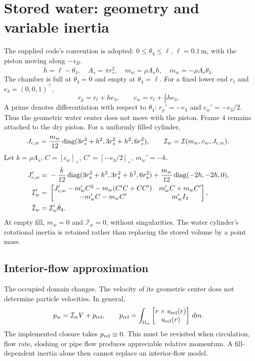 \documentclass[11pt,a4paper]{article}
\newcommand{\sk}[1]{[#1]_\times}\newcommand{\E}{\mathsf E}\newcommand{\B}{\mathsf B}
\begin{document}
\section{Stored water: geometry and variable inertia}
The supplied code's convention is adopted: \(0\leq\theta_4\leq\ell\),
\(\ell=0.1\,\mathrm m\), with the piston moving along \(-z_B\).
\begin{equation}
h=\ell-\theta_4,\quad A_s=\pi r_s^2,\quad m_w=\rho A_sh,\quad
\dot m_w=-\rho A_s\dot\theta_4.\label{eq:mass}
\end{equation}
The chamber is full at \(\theta_4=0\) and empty at \(\theta_4=\ell\).
For a fixed lower end \(r_t\) and \(e_3=(0,0,1)^\top\),
\begin{equation}
r_p=r_t+he_3,\qquad c_w=r_t+\tfrac12he_3.
\end{equation}
A prime denotes differentiation with respect to \(\theta_4\):
\(r_p'=-e_3\) and \(c_w'=-e_3/2\). Thus the geometric water center
does not move with the piston. Frame 4 remains attached to the dry piston.
For a uniformly filled cylinder,
\begin{equation}
J_{c,w}=\frac{m_w}{12}\operatorname{diag}(3r_s^2+h^2,3r_s^2+h^2,6r_s^2),\qquad
\mathcal I_w=\mathcal I(m_w,c_w,J_{c,w}).
\end{equation}
Let \(k=\rho A_s\), \(C=\sk{c_w}\), \(C'=\sk{-e_3/2}\), \(m_w'=-k\).
\begin{align}
J_{c,w}'={}&-\frac{k}{12}\operatorname{diag}(3r_s^2+h^2,3r_s^2+h^2,6r_s^2)
+\frac{m_w}{12}\operatorname{diag}(-2h,-2h,0),\\
\mathcal I_w'={}&\begin{bmatrix}
J_{c,w}'-m_w'C^2-m_w(C'C+CC')&m_w'C+m_wC'\\
-m_w'C-m_wC'&m_w'I_3\end{bmatrix},\\
\dot{\mathcal I}_w={}&\mathcal I_w'\dot\theta_4.\label{eq:Idot}
\end{align}
At empty fill, \(m_w=0\) and \(\mathcal I_w=0\), without singularities.
The water cylinder's rotational inertia is retained rather than replacing
the stored volume by a point mass.

\subsection{Interior-flow approximation}
The occupied domain changes. The velocity of its geometric center does
not determine particle velocities. In general,
\begin{equation}
p_w=\mathcal I_wV+p_{\rm rel},\qquad
p_{\rm rel}=\int_{\Omega_w}\begin{bmatrix}r\times u_{\rm rel}(r)\\u_{\rm rel}(r)\end{bmatrix}\,dm.
\end{equation}
The implemented closure takes \(p_{\rm rel}\simeq0\). This must be
revisited when circulation, flow rate, sloshing or pipe flow produces
appreciable relative momentum. A fill-dependent inertia alone then
cannot replace an interior-flow model.
\clearpage
\end{document}
